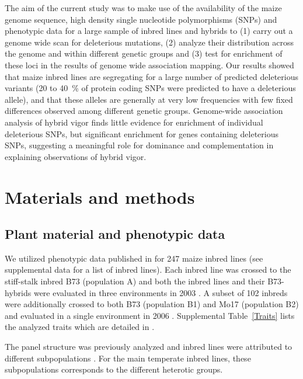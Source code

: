 \documentclass[12pt]{article}
\begin{document}
The aim of the current study was to make use of the availability of the maize genome sequence, high density single nucleotide polymorphisms (SNPs) and phenotypic data for a large sample of inbred lines and hybrids to (1) carry out a genome wide scan for deleterious mutations, (2) analyze their distribution across the genome and within different genetic groups and (3) test for enrichment of these loci in the results of genome wide association mapping. Our results showed that maize inbred lines are segregating for a large number of predicted deleterious variants (20 to 40 \,\% of protein coding SNPs were predicted to have a deleterious allele), and that these alleles are generally at very low frequencies with few fixed differences observed among different genetic groups. Genome-wide association analysis of hybrid vigor finds little evidence for enrichment of individual deleterious SNPs, but significant enrichment for genes containing deleterious SNPs, suggesting a meaningful role for dominance and complementation in explaining observations of hybrid vigor. 

\section*{Materials and methods}
\subsection*{Plant material and phenotypic data}

We utilized phenotypic data published in \citet{Flint-Garcia2005} for 247 maize inbred lines (see supplemental data for a list of inbred lines). Each inbred line was crossed to the stiff-stalk inbred B73 (population A) and both the inbred lines and their B73-hybrids were evaluated in three environments in 2003 \citep{Flint-Garcia2009}. A subset of 102 inbreds were additionally crossed to both B73 (population B1) and Mo17 (population B2) and evaluated in a single environment in 2006 \citep{Flint-Garcia2009}. Supplemental Table~\ref{Traits} lists the analyzed traits which are detailed in \citet{Flint-Garcia2009}.

The panel structure was previously analyzed and inbred lines were attributed to different subpopulations \citep{Flint-Garcia2005}. For the main temperate inbred lines, these subpopulations corresponds to the different heterotic groups.%
\end{document}
